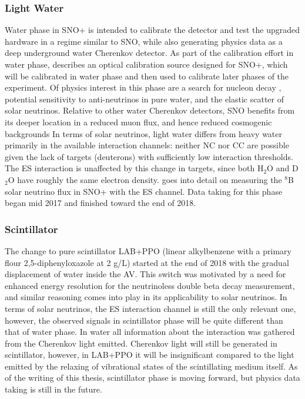 \subsubsection{Light Water}
Water phase in SNO+ is intended to calibrate the detector and test the upgraded hardware in a regime similar to SNO, while also generating physics data as a deep underground water Cherenkov detector.
As part of the calibration effort in water phase,  describes an optical calibration source designed for SNO+, which will be calibrated in water phase and then used to calibrate later phases of the experiment.
Of physics interest in this phase are a search for nucleon decay \cite{nucleon_decay}, potential sensitivity to anti-neutrinos in pure water, and the elastic scatter of solar neutrinos.
Relative to other water Cherenkov detectors, SNO benefits from its deeper location in a reduced muon flux, and hence reduced cosmogenic backgrounds
In terms of solar neutrinos, light water differs from heavy water primarily in the available interaction channels: neither NC nor CC are possible given the lack of targets (deuterons) with sufficiently low interaction thresholds.
The ES interaction is unaffected by this change in targets, since both H$_2$O and D$_2$O have roughly the same electron density.
 goes into detail on measuring the $^8$B solar neutrino flux in SNO+ with the ES channel.
Data taking for this phase began mid 2017 and finished toward the end of 2018.

\subsubsection{Scintillator}

The change to pure scintillator LAB+PPO (linear alkylbenzene with a primary flour 2,5-diphenyloxazole at 2 g/L) started at the end of 2018 with the gradual displacement of water inside the AV.
This switch was motivated by a need for enhanced energy resolution for the neutrinoless double beta decay measurement, and similar reasoning comes into play in its applicability to solar neutrinos.
In terms of solar neutrinos, the ES interaction channel is still the only relevant one, however, the observed signals in scintillator phase will be quite different than that of water phase.
In water all information about the interaction was gathered from the Cherenkov light emitted. 
Cherenkov light will still be generated in scintillator, however, in LAB+PPO it will be insignificant compared to the light emitted by the relaxing of vibrational states of the scintillating medium itself.
As of the writing of this thesis, scintillator phase is moving forward, but physics data taking is still in the future.

